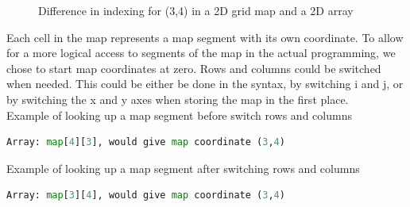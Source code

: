 \begin{figure}[htp]
    \centering
    \hspace{0.05\textwidth}  
    \caption{Difference in indexing for (3,4) in a 2D grid map and a 2D array}
    \label{fig:floor_plans}
\end{figure}

Each cell in the map represents a map segment with its own coordinate. To allow for a more logical access to segments of the map in the actual programming, we chose to start map coordinates at zero. Rows and columns could be switched when needed. This could be either be done in the syntax, by switching i and j, or by switching the x and y axes when storing the map in the first place.
\\

Example of looking up a map segment before switch rows and columns
\begin{lstlisting}[language=Python]
Array: map[4][3], would give map coordinate (3,4)
\end{lstlisting}

Example of looking up a map segment after switching rows and columns
\begin{lstlisting}[language=Python]
Array: map[3][4], would give map coordinate (3,4)
\end{lstlisting}

